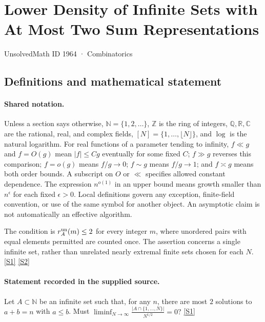 \documentclass[11pt,a4paper]{article}
\newcommand{\N}{\mathbb{N}}
\newcommand{\Z}{\mathbb{Z}}
\newcommand{\Q}{\mathbb{Q}}
\newcommand{\R}{\mathbb{R}}
\newcommand{\C}{\mathbb{C}}
\newcommand{\sref}[2]{\hyperlink{source:#1:#2}{[S#2]}}
\begin{document}

\setcounter{section}{1963}

\section{Lower Density of Infinite Sets with At Most Two Sum Representations}\label{1964}

{\small\sffamily UnsolvedMath ID 1964 · Combinatorics}

\subsection{Definitions and mathematical statement}

\paragraph{Shared notation.}Unless a section says otherwise, $\N=\{1,2,\ldots\}$,
$\Z$ is the ring of integers, $\Q,\R,\C$ are the rational, real, and complex
fields, $[N]=\{1,\ldots,\lfloor N\rfloor\}$, and $\log$ is the natural
logarithm. For real functions of a parameter tending to infinity,
$f\ll g$ and $f=O(g)$ mean $|f|\leq Cg$ eventually for some fixed $C$;
$f\gg g$ reverses this comparison; $f=o(g)$ means $f/g\to0$;
$f\sim g$ means $f/g\to1$; and $f\asymp g$ means both order bounds.
A subscript on $O$ or $\ll$ specifies allowed constant dependence.
The expression $n^{o(1)}$ in an upper bound means growth smaller than
$n^\epsilon$ for each fixed $\epsilon>0$. Local definitions govern any
exception, finite-field convention, or use of the same symbol for another
object. An asymptotic claim is not automatically an effective algorithm.



The condition is $r_A^{\rm un}(m)\leq2$ for every integer $m$, where unordered pairs with equal elements permitted are counted once. The assertion concerns a single infinite set, rather than unrelated nearly extremal finite sets chosen for each $N$. \sref{1964}{1} \sref{1964}{2}

\paragraph{Statement recorded in the supplied source.}
Let $A\subset \mathbb{N}$ be an infinite set such that, for any $n$, there are most $2$ solutions to $a+b=n$ with $a\leq b$. Must $ \liminf_{N\to\infty}\frac{\lvert A\cap \{1,\ldots,N\}\rvert}{N^{1/2}}=0? $ \sref{1964}{1}
\end{document}
